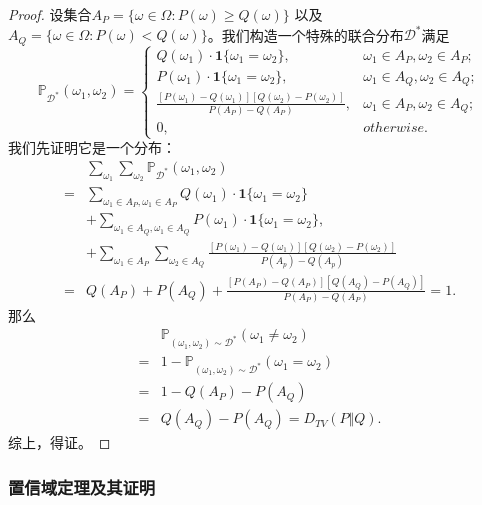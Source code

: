 \begin{proof}
    设集合$A_P = \{\omega \in \Omega: P(\omega) \ge Q(\omega)\}$ 以及 $A_Q = \{\omega \in \Omega: P(\omega) < Q(\omega)\}$。我们构造一个特殊的联合分布$\mathcal{D}^*$满足
    \begin{equation*}
        \mathbb{P}_{\mathcal{D}^*}(\omega_1, \omega_2) = 
        \begin{cases}
            Q(\omega_1) \cdot \mathbf{1}\{\omega_1 = \omega_2\}, & \omega_1 \in A_P, \omega_2 \in A_P; \\
            P(\omega_1) \cdot \mathbf{1}\{\omega_1 = \omega_2\}, & \omega_1 \in A_Q,  \omega_2 \in A_Q; \\
            \frac{[P(\omega_1) - Q(\omega_1)][Q(\omega_2) - P(\omega_2)]}
            {P(A_P) - Q(A_P)} , & \omega_1 \in A_P, \omega_2 \in A_Q; \\
            0, &otherwise.
        \end{cases}
    \end{equation*}
    我们先证明它是一个分布：
    \begin{align*}
        &\sum_{\omega_1}\sum_{\omega_2} \mathbb{P}_{\mathcal{D}^*}(\omega_1, \omega_2)\\
        =& \sum_{\omega_1 \in A_P, \omega_1 \in A_P} Q(\omega_1) \cdot \mathbf{1}\{\omega_1 = \omega_2\} \\
        &+ \sum_{\omega_1 \in A_Q, \omega_1 \in A_Q} P(\omega_1) \cdot \mathbf{1}\{\omega_1 = \omega_2\}, \\
        &+ \sum_{\omega_1 \in A_P}\sum_{\omega_2 \in A_Q}\frac{[P(\omega_1) - Q(\omega_1)][Q(\omega_2) - P(\omega_2)]} {P(A_p) - Q(A_p)} \\
        =& Q(A_P) + P(A_Q) + \frac{[P(A_P) - Q(A_P)][Q(A_Q) - P(A_Q)]} {P(A_P) - Q(A_P)} = 1.
    \end{align*}
    那么
    \begin{align*}
        &\mathbb{P}_{(\omega_1, \omega_2)\sim\mathcal{D}^*}(\omega_1 \ne \omega_2)\\
        =& 1 - \mathbb{P}_{(\omega_1, \omega_2)\sim\mathcal{D}^*}(\omega_1 =  \omega_2)\\
        =& 1 - Q(A_P) - P(A_Q)\\
        =& Q(A_Q) - P(A_Q) = D_{TV}(P \Vert Q).
    \end{align*}
    综上，得证。
\end{proof}

\subsubsection{置信域定理及其证明}


